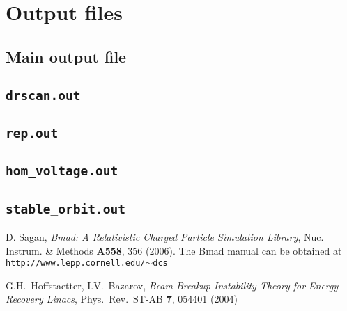 \documentclass[11pt]{article}
\begin{document}
\section{Output files} 

\subsection{Main output file}
\subsection{\tt{drscan.out}}
\subsection{\tt{rep.out}}
\subsection{\tt{hom_voltage.out}}
\subsection{\tt{stable_orbit.out}}

\begin{thebibliography}{9}


D. Sagan, {\em Bmad: A Relativistic Charged Particle Simulation Library},
Nuc. Instrum. \& Methods {\bf A558}, 356 (2006).
The Bmad manual can be obtained at {\tt http://www.lepp.cornell.edu/{$\sim$}dcs}

 G.H.~Hoffstaetter, I.V.~Bazarov, \emph{
Beam-Breakup Instability Theory for Energy Recovery Linacs},
Phys.~Rev.~ST-AB {\bf 7}, 054401 (2004)

\end{thebibliography}
\end{document}
